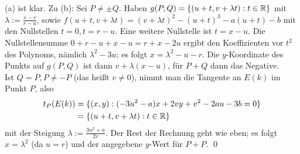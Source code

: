 	(a) ist klar. Zu (b): Sei $P \neq \pm Q$. Haben $g(P,Q) = \{ (u+t,v + \lambda t) : t \in \mathbb{R}\}$ mit $\lambda := \frac{s-v}{r-u}$, sowie $f(u+t, v+ \lambda t) = (v + \lambda t)^2 - (u+t)^3 - a(u+t) - b$ mit den Nullstellen $t = 0, t = r-u$. Eine weitere Nullstelle ist $t = x-u$. Die Nullstellensumme $0 + r-u + x - u = r + x - 2u$ ergibt den Koeffizienten vor $t^2$ des Polynoms, nämlich $\lambda^2 - 3u$; es folgt $x = \lambda^2 - u - r$. Die $y$-Koordinate des Punkts auf $g(P,Q)$ ist dann $v + \lambda(x - u)$, für $P+Q$ dann das Negative. \\
	Ist $Q = P, P \neq -P$ (das heißt $v \neq 0$), nimmt man die Tangente an $E(k)$ im Punkt $P$, also
	\begin{equation}
	\begin{aligned}
		t_P(E(k)) &= \{(x,y) : (-3u^2 - a)x + 2vy + v^2 - 2au - 3b = 0\} \\
		&= \{ (u+t, v+ \lambda t) : t \in \mathbb{R}\}
	\end{aligned}
	\end{equation}
	mit der Steigung $\lambda := \frac{3u^2 + a}{2v}$. Der Rest der Rechnung geht wie eben; es folgt $x = \lambda^2$ (da $u=r$) und der angegebene $y$-Wert für $P+P$. \qed